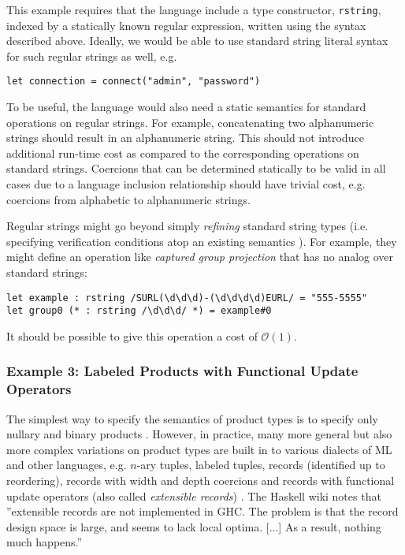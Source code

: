 This example requires that the language include a {type constructor}, \verb|rstring|, indexed by a statically known regular expression, written using the syntax described above. Ideally, we would be able to use standard string literal syntax for such regular strings as well, e.g.
\begin{lstlisting}[numbers=none]
let connection = connect("admin", "password")
\end{lstlisting}

To be useful, the language would also need a static semantics for standard operations on regular strings. For example, concatenating two alphanumeric strings  should result in an  alphanumeric string. This should not introduce additional run-time cost as compared to the corresponding operations on standard strings. Coercions that can be determined statically to be valid in all cases due to a language inclusion relationship should have trivial cost, e.g. coercions from alphabetic to alphanumeric strings.

Regular strings might go beyond simply \emph{refining} standard string types (i.e. specifying verification conditions atop an existing semantics \cite{Freeman91}). For example, they might define an operation like \emph{captured group projection} that has no analog over standard strings:
\begin{lstlisting}[numbers=none]
let example : rstring /SURL(\d\d\d)-(\d\d\d\d)EURL/ = "555-5555"
let group0 (* : rstring /\d\d\d/ *) = example#0
\end{lstlisting}
It should be possible to give this operation a cost of $\mathcal{O}(1)$. %

\subsubsection{Example 3: Labeled Products with Functional Update Operators}\label{sec:lprod}
The simplest way to specify the semantics of product types is to specify only nullary and binary products \cite{pfpl}. However, in practice, many more general but also more complex variations on product types are built in to various dialects of ML and other languages, e.g. $n$-ary tuples, labeled tuples, 
records (identified up to reordering), 
records with width and depth coercions \cite{Cardelli:1984:SMI:1096.1098} and records with functional update operators (also called \emph{extensible records}) \cite{ocaml-manual}. {The Haskell wiki notes that ''extensible records  are not implemented in GHC. The problem is that the record design space is large, and seems to lack local optima. [...] As a result, nothing much happens.'' \cite{GHCFAQ}}%


